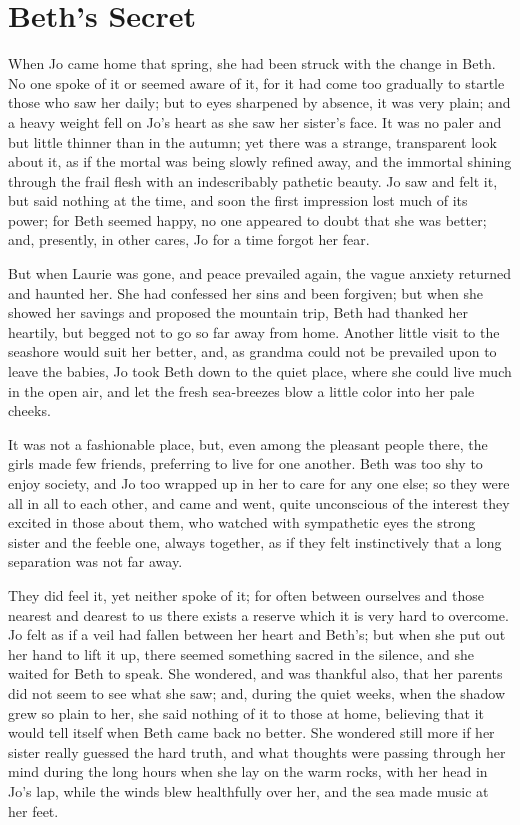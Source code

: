 \chapter{Beth's Secret}

{When} Jo came home that spring, she had been struck with the change in
Beth. No one spoke of it or seemed aware of it, for it had come too
gradually to startle those who saw her daily; but to eyes sharpened by
absence, it was very plain; and a heavy weight fell on
Jo's heart as she saw her sister's face.
It was no paler and but little thinner than in the autumn; yet there was
a strange, transparent look about it, as if the mortal was being slowly
refined away, and the immortal shining through the frail flesh with an
indescribably pathetic beauty. Jo saw and felt it, but said nothing at
the time, and soon the first impression lost much of its power; for Beth
seemed happy, no one appeared to doubt that she was better; and,
presently, in other cares, Jo for a time forgot her fear.

But when Laurie was gone, and peace prevailed again, the vague anxiety
returned and haunted her. She had confessed her sins and been forgiven;
but when she showed her savings and proposed the mountain trip, Beth had
thanked her heartily, but begged not to go so far away from home.
Another little visit to the seashore would suit her better, and, as
grandma could not be prevailed upon to leave the babies, Jo took Beth
down to the quiet place, where she could live much in the open air, and
let the fresh sea-breezes blow a little color into her pale cheeks.

It was not a fashionable place, but, even among the pleasant people
there, the girls made few friends, preferring to live for one another.
Beth was too shy to enjoy society, and Jo too wrapped up in her to care
for any one else; so they were all in all to each other, and came and
went, quite unconscious of the interest they excited in those about
them, who watched with sympathetic eyes the strong sister and the feeble
one, always together, as if they felt instinctively that a long
separation was not far away.

They did feel it, yet neither spoke of it; for often between ourselves
and those nearest and dearest to us there exists a reserve which it is
very hard to overcome. Jo felt as if a veil had fallen between her heart
and Beth's; but when she put out her hand to lift it up,
there seemed something sacred in the silence, and she waited for Beth to
speak. She wondered, and was thankful also, that her parents did not
seem to see what she saw; and, during the quiet weeks, when the shadow
grew so plain to her, she said nothing of it to those at home, believing
that it would tell itself when Beth came back no better. She wondered
still more if her sister really guessed the hard truth, and what
thoughts were passing through her mind during the long hours when she
lay on the warm rocks, with her head in Jo's lap, while
the winds blew healthfully over her, and the sea made music at her feet.

